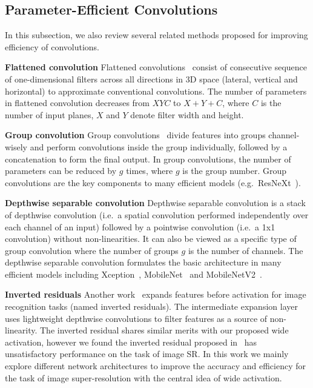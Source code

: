 \documentclass{article}
\begin{document}
\subsection{Parameter-Efficient Convolutions}

In this subsection, we also review several related methods proposed for improving efficiency of convolutions.

\textbf{Flattened convolution} Flattened convolutions~\cite{jin2014flattened} consist of consecutive sequence of one-dimensional filters across all directions in 3D space (lateral, vertical and horizontal) to approximate conventional convolutions. The number of parameters in flattened convolution decreases from \(XYC\) to \(X+Y+C\), where \(C\) is the number of input planes, \(X\) and \(Y\) denote filter width and height.

\textbf{Group convolution} Group convolutions~\cite{xie2017aggregated} divide features into groups channel-wisely and perform convolutions inside the group individually, followed by a concatenation to form the final output. In group convolutions, the number of parameters can be reduced by \(g\) times, where \(g\) is the group number. Group convolutions are the key components to many efficient models (e.g.\ ResNeXt~\cite{xie2017aggregated}).

\textbf{Depthwise separable convolution} Depthwise separable convolution is a stack of depthwise convolution (i.e.\ a spatial convolution performed independently over each channel of an input) followed by a pointwise convolution (i.e.\ a 1x1 convolution) without non-linearities. It can also be viewed as a specific type of group convolution where the number of groups \(g\) is the number of channels. The depthwise separable convolution formulates the basic architecture in many efficient models including Xception~\cite{chollet2016xception}, MobileNet~\cite{howard2017mobilenets} and MobileNetV2~\cite{2018arXiv180104381S}.

\textbf{Inverted residuals} Another work~\cite{2018arXiv180104381S} expands features before activation for image recognition tasks (named inverted residuals). The intermediate expansion layer uses lightweight depthwise convolutions to filter features as a source of non-linearity. The inverted residual shares similar merits with our proposed wide activation, however we found the inverted residual proposed in~\cite{2018arXiv180104381S} has unsatisfactory performance on the task of image SR. In this work we mainly explore different network architectures to improve the accuracy and efficiency for the task of image super-resolution with the central idea of wide activation. 
\end{document}
